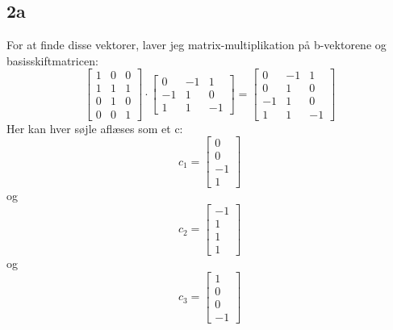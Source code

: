 \documentclass{article}
\begin{document}
\subsection*{2a}
For at finde disse vektorer, laver jeg matrix-multiplikation på b-vektorene og basisskiftmatricen:
$$
\left[\begin{array}{lll}
1 & 0 & 0 \\
1 & 1 & 1 \\
0 & 1 & 0 \\
0 & 0 & 1
\end{array}\right] \cdot\left[\begin{array}{ccc}
0 & -1 & 1 \\
-1 & 1 & 0 \\
1 & 1 & -1
\end{array}\right]=\left[\begin{array}{ccc}
0 & -1 & 1 \\
0 & 1 & 0 \\
-1 & 1 & 0 \\
1 & 1 & -1
\end{array}\right]
$$
Her kan hver søjle aflæses som et c:
$$
c_1=\left[\begin{array}{c}
0 \\
0 \\
-1 \\
1
\end{array}\right]
$$
og
$$
c_2=\left[\begin{array}{c}
-1 \\
1 \\
1 \\
1
\end{array}\right]
$$
og
$$
c_3=\left[\begin{array}{c}
1 \\
0 \\
0 \\
-1
\end{array}\right]
$$
\end{document}
